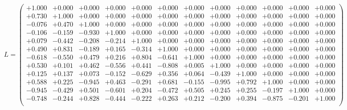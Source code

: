 \documentclass[9pt]{article}
\theoremstyle{plain}
\theoremstyle{definition}
\theoremstyle{remark}
\numberwithin{equation}{section}
\begin{document}
$L = \left(
\begin{array}{
cccccccccccc}
+1.000 & +0.000 & +0.000 & +0.000 & +0.000 & +0.000 & +0.000 & +0.000 & +0.000 & +0.000 & +0.000 & +0.000 \\
+0.730 & +1.000 & +0.000 & +0.000 & +0.000 & +0.000 & +0.000 & +0.000 & +0.000 & +0.000 & +0.000 & +0.000 \\
-0.076 & +0.470 & +1.000 & +0.000 & +0.000 & +0.000 & +0.000 & +0.000 & +0.000 & +0.000 & +0.000 & +0.000 \\
-0.106 & -0.159 & -0.930 & +1.000 & +0.000 & +0.000 & +0.000 & +0.000 & +0.000 & +0.000 & +0.000 & +0.000 \\
+0.079 & -0.442 & -0.208 & -0.214 & +1.000 & +0.000 & +0.000 & +0.000 & +0.000 & +0.000 & +0.000 & +0.000 \\
+0.490 & +0.831 & -0.189 & +0.165 & -0.314 & +1.000 & +0.000 & +0.000 & +0.000 & +0.000 & +0.000 & +0.000 \\
-0.618 & -0.550 & +0.479 & +0.216 & +0.804 & -0.641 & +1.000 & +0.000 & +0.000 & +0.000 & +0.000 & +0.000 \\
+0.530 & +0.101 & +0.462 & -0.556 & +0.441 & -0.808 & +0.005 & +1.000 & +0.000 & +0.000 & +0.000 & +0.000 \\
+0.125 & +0.137 & +0.073 & -0.152 & -0.629 & +0.356 & +0.064 & -0.439 & +1.000 & +0.000 & +0.000 & +0.000 \\
+0.588 & +0.225 & -0.945 & +0.463 & -0.291 & +0.681 & -0.155 & -0.995 & +0.792 & +1.000 & +0.000 & +0.000 \\
-0.945 & -0.429 & +0.501 & -0.601 & +0.204 & -0.472 & +0.505 & +0.245 & +0.255 & -0.197 & +1.000 & +0.000 \\
-0.748 & -0.244 & +0.828 & -0.444 & -0.222 & +0.263 & +0.212 & -0.200 & +0.394 & -0.875 & -0.201 & +1.000 \\
\end{array}
\right)$ \newline 
\end{document}
